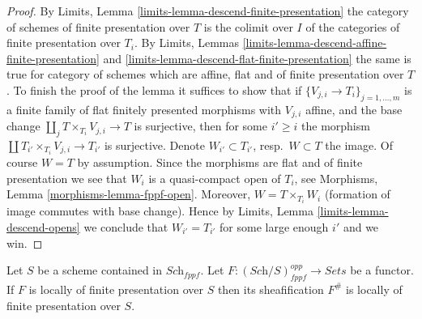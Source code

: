 \begin{proof}
By
Limits, Lemma \ref{limits-lemma-descend-finite-presentation}
the category of schemes of finite presentation over $T$ is the
colimit over $I$ of the categories of finite presentation over $T_i$. By
Limits, Lemmas \ref{limits-lemma-descend-affine-finite-presentation}
and \ref{limits-lemma-descend-flat-finite-presentation}
the same is true for category of schemes which are affine, flat and
of finite presentation over $T$.
To finish the proof of the lemma it suffices to show that if
$\{V_{j, i} \to T_i\}_{j = 1, \ldots, m}$ is a finite family of
flat finitely presented morphisms with $V_{j, i}$ affine, and the
base change $\coprod_j T \times_{T_i} V_{j, i} \to T$ is surjective,
then for some $i' \geq i$ the morphism
$\coprod T_{i'} \times_{T_i} V_{j, i} \to T_{i'}$ is surjective.
Denote $W_{i'} \subset T_{i'}$, resp.\ $W \subset T$ the image.
Of course $W = T$ by assumption.
Since the morphisms are flat and of finite presentation we see that
$W_i$ is a quasi-compact open of $T_i$, see
Morphisms, Lemma \ref{morphisms-lemma-fppf-open}.
Moreover, $W = T \times_{T_i} W_i$ (formation of image commutes
with base change). Hence by
Limits, Lemma \ref{limits-lemma-descend-opens}
we conclude that $W_{i'} = T_{i'}$ for some large enough $i'$
and we win.
\end{proof}

\begin{lemma}
\label{lemma-sheafify-finite-presentation}
Let $S$ be a scheme contained in $\textit{Sch}_{fppf}$.
Let $F : (\textit{Sch}/S)_{fppf}^{opp} \to \textit{Sets}$ be a functor.
If $F$ is locally of finite presentation over $S$ then its sheafification
$F^\#$ is locally of finite presentation over $S$.
\end{lemma}


